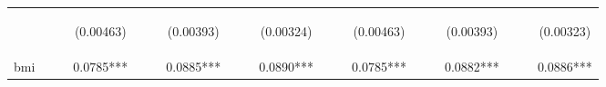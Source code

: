 \documentclass[]{article}
\begin{document}
\begin{center}
\begin{tabular}{lcccccccccccccccccc}
\vspace{4pt} & \begin{footnotesize}\end{footnotesize} & \begin{footnotesize}\end{footnotesize} & \begin{footnotesize}(0.00463)\end{footnotesize} & \begin{footnotesize}\end{footnotesize} & \begin{footnotesize}\end{footnotesize} & \begin{footnotesize}(0.00393)\end{footnotesize} & \begin{footnotesize}\end{footnotesize} & \begin{footnotesize}\end{footnotesize} & \begin{footnotesize}(0.00324)\end{footnotesize} & \begin{footnotesize}\end{footnotesize} & \begin{footnotesize}\end{footnotesize} & \begin{footnotesize}(0.00463)\end{footnotesize} & \begin{footnotesize}\end{footnotesize} & \begin{footnotesize}\end{footnotesize} & \begin{footnotesize}(0.00393)\end{footnotesize} & \begin{footnotesize}\end{footnotesize} & \begin{footnotesize}\end{footnotesize} & \begin{footnotesize}(0.00323)\end{footnotesize} \\
bmi &  &  & 0.0785*** &  &  & 0.0885*** &  &  & 0.0890*** &  &  & 0.0785*** &  &  & 0.0882*** &  &  & 0.0886*** \\

\end{tabular}
\end{center}
\end{document}
